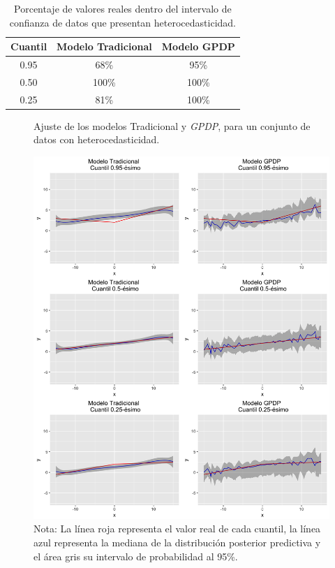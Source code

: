 \begin{table}[H]
\centering
\caption{Porcentaje de valores reales dentro del intervalo de confianza de datos que presentan heterocedasticidad.} 
\begin{tabular}{ccc}
  \hline
Cuantil & Modelo Tradicional & Modelo GPDP \\ 
  \hline
0.95 & 68\% & 95\% \\ 
  0.50 & 100\% & 100\% \\ 
  0.25 & 81\% & 100\% \\ 
   \hline
\end{tabular}
\label{within_heteroscedasticity}
\end{table}

\begin{figure}[htbp]
	\centering
	\caption{Ajuste de los modelos Tradicional y \textit{GPDP}, para un conjunto de datos con heterocedasticidad.}
	\includegraphics[width=\textwidth]{Figures/Simulation/heteroscedasticity/predictions.png}
	\captionsetup{singlelinecheck=off,font=footnotesize}
    \caption*{Nota: La l\'inea roja representa el valor real de cada cuantil, la l\'inea azul representa la mediana de la distribuci\'on posterior predictiva y el \'area gris su intervalo de probabilidad al 95\%.}
	\label{models_heteroscedasticity}
\end{figure}

